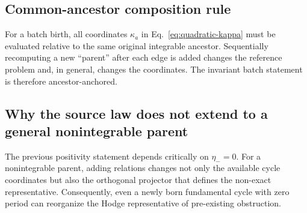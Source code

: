 \documentclass[aip,jmp,amsmath,amssymb,reprint]{revtex4-2}
\begin{document}
\subsection{Common-ancestor composition rule}

For a batch birth, all coordinates $\kappa_a$ in Eq.~\eqref{eq:quadratic-kappa} must be evaluated relative to the same original integrable ancestor. Sequentially recomputing a new ``parent'' after each edge is added changes the reference problem and, in general, changes the coordinates. The invariant batch statement is therefore ancestor-anchored.

\subsection{Why the source law does not extend to a general nonintegrable parent}

The previous positivity statement depends critically on $\eta_-=0$. For a nonintegrable parent, adding relations changes not only the available cycle coordinates but also the orthogonal projector that defines the non-exact representative. Consequently, even a newly born fundamental cycle with zero period can reorganize the Hodge representative of pre-existing obstruction.
\end{document}
